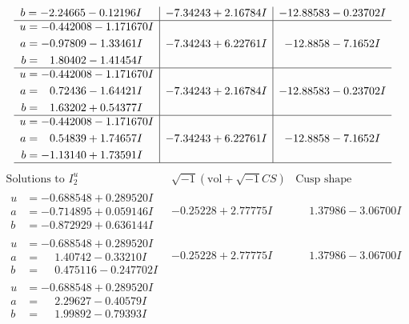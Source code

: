 \documentclass[1p]{elsarticle_modified}
\theoremstyle{definition}
\newcommand{\I}{\sqrt{-1}}
\begin{document}
$$\begin{array}{c|c|c}
\begin{aligned}
b &= -2.24665 - 0.12196 I\end{aligned}
 & -7.34243 + 2.16784 I & -12.88583 - 0.23702 I \\ \hline\begin{aligned}
u &= -0.442008 - 1.171670 I \\
a &= -0.97809 - 1.33461 I \\
b &= \phantom{-}1.80402 - 1.41454 I\end{aligned}
 & -7.34243 + 6.22761 I & -12.8858 - 7.1652 I \\ \hline\begin{aligned}
u &= -0.442008 - 1.171670 I \\
a &= \phantom{-}0.72436 - 1.64421 I \\
b &= \phantom{-}1.63202 + 0.54377 I\end{aligned}
 & -7.34243 + 2.16784 I & -12.88583 - 0.23702 I \\ \hline\begin{aligned}
u &= -0.442008 - 1.171670 I \\
a &= \phantom{-}0.54839 + 1.74657 I \\
b &= -1.13140 + 1.73591 I\end{aligned}
 & -7.34243 + 6.22761 I & -12.8858 - 7.1652 I\\
 \hline 
 \end{array}$$\newpage$$\begin{array}{c|c|c}  
\text{Solutions to }I^u_{2}& \I (\text{vol} + \sqrt{-1}CS) & \text{Cusp shape}\\
 \hline 
\begin{aligned}
u &= -0.688548 + 0.289520 I \\
a &= -0.714895 + 0.059146 I \\
b &= -0.872929 + 0.636144 I\end{aligned}
 & -0.25228 + 2.77775 I & \phantom{-}1.37986 - 3.06700 I \\ \hline\begin{aligned}
u &= -0.688548 + 0.289520 I \\
a &= \phantom{-}1.40742 - 0.33210 I \\
b &= \phantom{-}0.475116 - 0.247702 I\end{aligned}
 & -0.25228 + 2.77775 I & \phantom{-}1.37986 - 3.06700 I \\ \hline\begin{aligned}
u &= -0.688548 + 0.289520 I \\
a &= \phantom{-}2.29627 - 0.40579 I \\
b &= \phantom{-}1.99892 - 0.79393 I\end{aligned}

\end{array}$$
\end{document}
